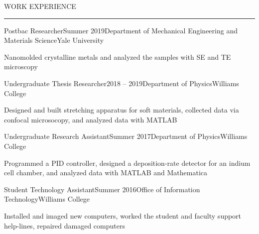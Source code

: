 \documentclass{short_resume} %
\renewenvironment{rSection}[1]{
	\sectionskip
	\textcolor{RoyalPurple}{\MakeUppercase{#1}}
	\sectionlineskip
	\hrule
	\begin{list}{}{
			\setlength{\leftmargin}{1.5em}
		}
		\item[]
	}{
	\end{list}
}
\begin{document}
	\begin{rSection}{Work Experience}
		\begin{rSubsection}{Postbac Researcher}{Summer 2019}{Department of Mechanical Engineering and Materials Science}{Yale University}
			\item[] Nanomolded crystalline metals and analyzed the samples with SE and TE microscopy
			\vspace{-.2em}
		\end{rSubsection}
		\vspace{-.2em}
		\begin{rSubsection}{Undergraduate Thesis Researcher}{2018 -- 2019}{Department of Physics}{Williams College}
			\item[] Designed and built stretching apparatus for soft materials, collected data via confocal microsocopy, and analyzed data with MATLAB
			\vspace{-.2em}
		\end{rSubsection}
		\vspace{-.2em}
		\begin{rSubsection}{Undergraduate Research Assistant}{Summer 2017}{Department of Physics}{Williams College}
			\item[] Programmed a PID controller, designed a deposition-rate detector for an indium cell chamber, and analyzed data with MATLAB and Mathematica
		\end{rSubsection}
		\vspace{-.2em}
		\begin{rSubsection}{Student Technology Assistant}{Summer 2016}{Office of Information Technology}{Williams College}
		\item[] Installed and imaged new computers, worked the student and faculty support help-lines, repaired damaged computers
		\vspace{-.2em}
		\end{rSubsection}
	
	\end{rSection}
	
\end{document}
